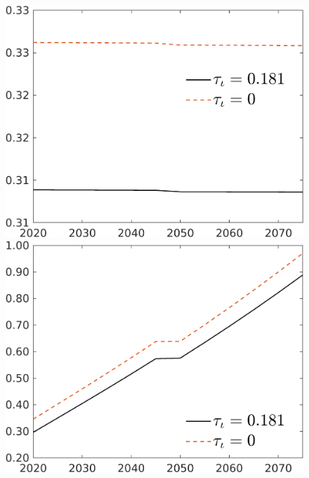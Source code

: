 \begin{figure}[h!!]
\begin{minipage}[]{0.32\textwidth}
\end{minipage}
\begin{minipage}[]{0.32\textwidth}
\includegraphics[width=1\textwidth]{../../codding_model/own_basedOnFried/optimalPol_010922_revision/figures/all_5Sept22/CompTaul_Reg7_hl_spillover0_nsk0_xgr0_sep1_LFlimit1_emsbase0_countec0_GovRev1_etaa0.79_lgd1.png}
\end{minipage}
\begin{minipage}[]{0.32\textwidth}
\includegraphics[width=1\textwidth]{../../codding_model/own_basedOnFried/optimalPol_010922_revision/figures/all_5Sept22/CompTaul_Reg7_C_spillover0_nsk0_xgr0_sep1_LFlimit1_emsbase0_countec0_GovRev1_etaa0.79_lgd1.png}

\end{minipage}
\end{figure}
